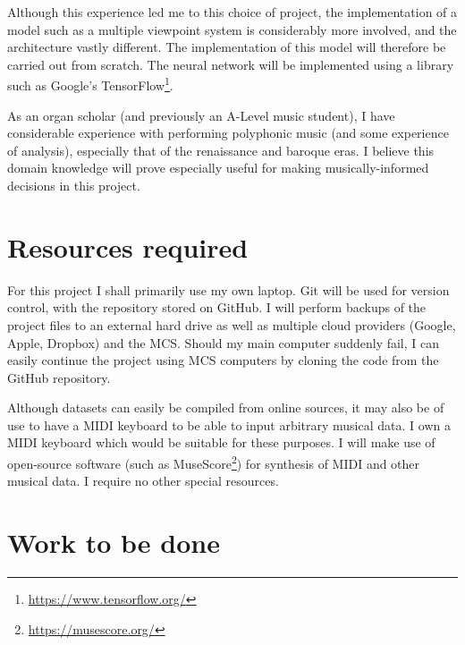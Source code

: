 \documentclass[12pt,a4paper,twoside]{article}
\begin{document}
Although this experience led me to this choice of project, the implementation of
a model such as a multiple viewpoint system is considerably more involved, and
the architecture vastly different. The implementation of this model will
therefore be carried out from scratch.  The neural network will be implemented
using a library such as Google's
TensorFlow\footnote{\url{https://www.tensorflow.org/}}.

As an organ scholar (and previously an A-Level music student), I have
considerable experience with performing polyphonic music (and some experience of
analysis), especially that of the renaissance and baroque eras. I believe this
domain knowledge will prove especially useful for making musically-informed
decisions in this project. 

\section*{Resources required}

For this project I shall primarily use my own laptop. Git will be used for
version control, with the repository stored on GitHub. I will perform backups of
the project files to an external hard drive as well as multiple cloud providers
(Google, Apple, Dropbox) and the MCS. Should my main computer suddenly fail, I
can easily continue the project using MCS computers by cloning the code from the
GitHub repository.

Although datasets can easily be compiled from online sources, it may also be of
use to have a MIDI keyboard to be able to input arbitrary musical data. I own a
MIDI keyboard which would be suitable for these purposes. I will make use of
open-source software (such as MuseScore\footnote{\url{https://musescore.org/}})
for synthesis of MIDI and other musical data. I require no other special
resources.

\section*{Work to be done}
\end{document}
